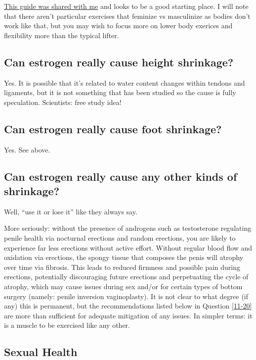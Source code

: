 \documentclass{article}
\begin{document}
\href{https://web.archive.org/web/20250821023939/https://docs.google.com/document/d/1DXFxzN0XTudPZez_SO61fpqncRLPH_Be_QG_8Pcz9LU/edit?tab=t.0}{This guide was shared with me} and looks to be a good starting place. I will note that there aren't particular exercises that feminize vs masculinize as bodies don't work like that, but you may wish to focus more on lower body exerices and flexibility more than the typical lifter.

\subsection{Can estrogen really cause height shrinkage?}

Yes. It is possible that it’s related to water content changes within tendons and ligaments, but it is not something that has been studied so the cause is fully speculation. Scientists: free study idea!

\subsection{Can estrogen really cause foot shrinkage?}

Yes. See above.

\subsection{Can estrogen really cause any other kinds of shrinkage?}\label{11-19}

Well, “use it or lose it” like they always say.

More seriously: without the presence of androgens such as testosterone regulating penile health via nocturnal erections and random erections, you are likely to experience far less erections without active effort. Without regular blood flow and oxidation via erections, the spongy tissue that composes the penis will atrophy over time via fibrosis. This leads to reduced firmness and possible pain during erections, potentially discouraging future erections and perpetuating the cycle of atrophy, which may cause issues during sex and/or for certain types of bottom surgery (namely: penile inversion vaginoplasty). It is not clear to what degree (if any) this is permanent, but the recommendations listed below in Question \ref{11-20} are more than sufficient for adequate mitigation of any issues. In simpler terms: it is a muscle to be exercised like any other.

\subsection*{Sexual Health}
\end{document}
